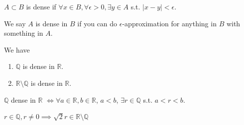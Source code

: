 \begin{definition}[Density]
    $A \subset B$ is dense if $
    \forall x \in B, \forall \epsilon > 0,
    \exists y \in A 
    $ s.t. $ |x - y| < \epsilon$.
    \medskip
\end{definition}
\begin{remark}
    We say $A$ is dense in $B$ if 
    you can do $\epsilon$-approximation for anything in $B$ 
    with something in $A$.
\end{remark}



\begin{theorem}
    We have
    \begin{enumerate}
        \item $\mathbb{Q}$ is dense in $\mathbb{R}$.
        \item $\mathbb{R} \setminus \mathbb{Q}$ is dense in $\mathbb{R}$.
    \end{enumerate}
\end{theorem}

\begin{remark}
    $\mathbb{Q}$ dense in $\mathbb{R}$ 
    $\iff \forall a \in \mathbb{R}, b \in \mathbb{R}$, 
    $a < b$, 
    $\exists r \in \mathbb{Q}$ s.t. 
    $a < r < b$.
\end{remark}

\begin{remark}
    $r \in \mathbb{Q}, r \neq 0 \implies \sqrt{2}r \in \mathbb{R} \setminus \mathbb{Q}$
\end{remark}

